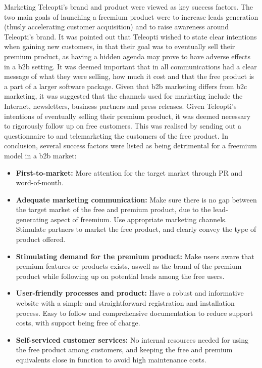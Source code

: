 Marketing Teleopti's brand and product were viewed as key success factors. The two main goals of launching a freemium product were to increase leads generation (thusly accelerating customer acquisition) and to raise awareness around Teleopti's brand. It was pointed out that Teleopti wished to state clear intentions when gaining new customers, in that their goal was to eventually sell their premium product, as having a hidden agenda may prove to have adverse effects in a \gls{b2b} setting. It was deemed important that in all communications had a clear message of what they were selling, how much it cost and that the free product is a part of a larger software package. Given that \gls{b2b} marketing differs from \gls{b2c} marketing, it was suggested that the channels used for marketing include the Internet, newsletters, business partners and press releases. Given Teleopti's intentions of eventually selling their premium product, it was deemed necessary to rigorously follow up on free customers. This was realised by sending out a questionnaire to and telemarketing the customers of the free product. 
\newpage
In conclusion, several success factors were listed as being detrimental for a freemium model in a \gls{b2b} market:
\begin{itemize}
    \item \textbf{First-to-market: }More attention for the target market through PR and word-of-mouth. 
    \item \textbf{Adequate marketing communication: }Make sure there is no gap between the target market of the free and premium product, due to the lead-generating aspect of freemium. Use appropriate marketing channels. Stimulate partners to market the free product, and clearly convey the type of product offered.
    \item \textbf{Stimulating demand for the premium product: }Make users aware that premium features or products exists, aswell as the brand of the premium product while following up on potential leads among the free users. 
    \item \textbf{User-friendly processes and product: }Have a robust and informative website with a simple and straightforward registration and installation process. Easy to follow and comprehensive documentation to reduce support costs, with support being free of charge.
    \item \textbf{Self-serviced customer services: }No internal resources needed for using the free product among customers, and keeping the free and premium equivalents close in function to avoid high maintenance costs. 
\end{itemize}

